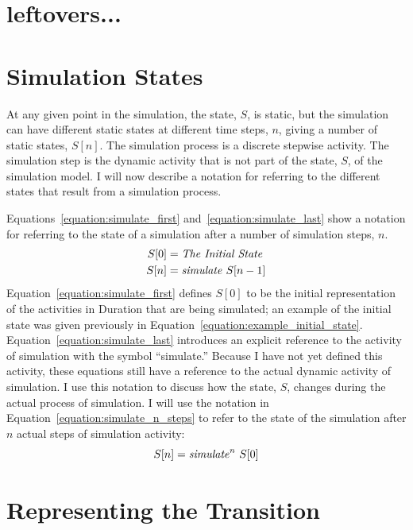 \section{leftovers...}

\section{Simulation States}

At any given point in the simulation, the state, $S$, is static, but
the simulation can have different static states at different time
steps, $n$, giving a number of static states, $S[n]$.  The simulation
process is a discrete stepwise activity.  The simulation step is the
dynamic activity that is not part of the state, $S$, of the simulation
model.  I will now describe a notation for referring to the different
states that result from a simulation process.

Equations~\ref{equation:simulate_first}
and~\ref{equation:simulate_last} show a notation for referring to the
state of a simulation after a number of simulation steps, $n$.
\begin{align}
\label{equation:simulate_first}
S[0] &= \text{\emph{The Initial State}} \\
\label{equation:simulate_last}
S[n] &= \text{\emph{simulate}}~S[n-1]
\end{align}
Equation~\ref{equation:simulate_first} defines $S[0]$ to be
the initial representation of the activities in Duration that are
being simulated; an example of the initial state was given previously
in Equation~\ref{equation:example_initial_state}.
Equation~\ref{equation:simulate_last} introduces an explicit reference
to the activity of simulation with the symbol ``simulate.''  Because I
have not yet defined this activity, these equations still have a
reference to the actual dynamic activity of simulation.  I use this
notation to discuss how the state, $S$, changes during the
actual process of simulation.  I will use the notation in
Equation~\ref{equation:simulate_n_steps} to refer to the state of the
simulation after $n$ actual steps of simulation activity:
\begin{equation}
\label{equation:simulate_n_steps}
S[n] = \text{\emph{simulate}}^n~S[0]
\end{equation}

\section{Representing the Transition}

